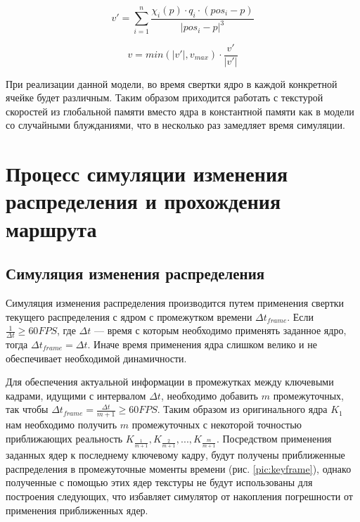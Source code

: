 \begin{itemize}
{\begin{equation}
  v' = \sum\limits_{i=1}^n\frac{\chi_i(p) \cdot q_i \cdot (pos_i-p)} {|pos_i-p|^3} 
\end{equation}

\begin{equation}\label{eq:vqulon}
  v = min(|v'|, v_{max}) \cdot \frac {v'} {|v'|}
\end{equation}

При реализации данной модели, во время свертки ядро в каждой конкретной ячейке будет различным.
Таким образом приходится работать с текстурой скоростей из глобальной памяти вместо ядра в константной
памяти как в модели со случайными блужданиями, что в несколько раз замедляет время симуляции.
}
\end{itemize}
\FloatBarrier

\section{Процесс симуляции изменения распределения
 и прохождения маршрута}
\FloatBarrier
\subsection{Симуляция изменения распределения}

Симуляция изменения распределения производится путем применения свертки текущего
распределения с ядром с промежутком времени $\Delta t_{frame}$. Если
$\frac {1} {\Delta t} \ge 60 FPS$, где $\Delta t$ --- время с которым необходимо применять
заданное ядро, тогда $\Delta t_{frame} = \Delta t$. Иначе время применения ядра слишком велико
и не обеспечивает необходимой динамичности.

Для обеспечения актуальной информации в промежутках между ключевыми кадрами, идущими с 
интервалом $\Delta t$, необходимо добавить $m$ промежуточных, так чтобы
$\Delta t_{frame} = \frac {\Delta t} {m + 1} \ge 60 FPS$. Таким образом из оригинального ядра
 $K_1$ нам необходимо получить $m$ промежуточных с некоторой точностью приближающих реальность 
$K_{\frac {1} {m+1}}, K_{\frac {2} {m + 1}}, ... , K_{\frac {m} {m + 1}}$. Посредством применения
заданных ядер к последнему ключевому кадру, будут получены приближенные распределения в 
промежуточные моменты времени (рис. \ref{pic:keyframe}), однако полученные с помощью этих
 ядер текстуры не будут использованы для построения следующих, что избавляет симулятор 
от накопления погрешности от применения приближенных ядер.

